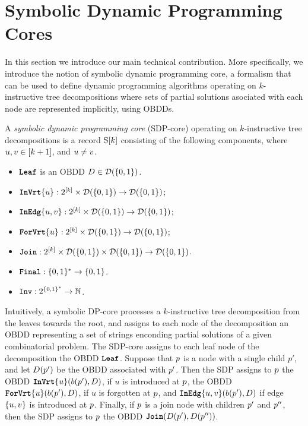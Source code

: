 \section{Symbolic Dynamic Programming Cores}
\label{SymbolicDPCores}

In this section we introduce our main technical contribution. More specifically, we introduce the notion of symbolic dynamic programming core, a formalism that can be used to define dynamic programming algorithms operating on $k$-instructive tree decompositions where sets of partial solutions asociated with each node are represented implicitly, using OBDDs. 

A {\em symbolic dynamic programming core} (SDP-core) operating on $k$-instructive tree decompositions is a record $\mathrm{S}[k]$ consisting of the following components, where $u,v \in [k+1]$, and 
$u\neq v$. 

\begin{itemize}
    \item $\texttt{\textbf{Leaf}}$ is an OBDD $D\in \mathcal{D}(\{0,1\})$. 
    \item $\texttt{\textbf{InVrt}}\{u\}:2^{[k]}\times  
    \mathcal{D}(\{0,1\})\rightarrow \mathcal{D}(\{0,1\})$;
    \item $\texttt{\textbf{InEdg}}\{u,v\}:2^{[k]}\times\mathcal{D}(\{0,1\})\rightarrow \mathcal{D}(\{0,1\})$;
    \item $\texttt{\textbf{ForVrt}}\{u\}:2^{[k]}\times \mathcal{D}(\{0,1\})\rightarrow \mathcal{D}(\{0,1\})$;
    \item $\texttt{\textbf{Join}}:2^{[k]}\times \mathcal{D}(\{0,1\})\times 
    \mathcal{D}(\{0,1\})
    \rightarrow 
    \mathcal{D}(\{0,1\})$.
    \item $\texttt{Final}:\{0,1\}^*\rightarrow \{0,1\}$. 
    \item $\texttt{Inv}:2^{\{0,1\}^*}\rightarrow \mathbb{N}$. 
\end{itemize}


Intuitively, a symbolic DP-core processes a $k$-instructive tree decomposition from the leaves towards the root, and assigns to each node of the decomposition an OBDD representing a set of strings enconding partial solutions of a given combinatorial problem. The SDP-core assigns to each leaf node of the decomposition the OBDD $\texttt{\textbf{Leaf}}$. Suppose that $p$ is a node with a single child $p'$, and let $D(p')$ be the OBDD associated with $p'$. Then the SDP assigns to $p$ the OBDD 
$\texttt{\textbf{InVrt}}\{u\}(b(p'),D)$, if $u$ is introduced at $p$, the OBDD 
$\texttt{\textbf{ForVrt}}\{u\}(b(p'),D)$, if $u$ is forgotten at $p$, and 
$\texttt{\textbf{InEdg}}\{u,v\}(b(p'),D)$ if edge $\{u,v\}$ is introduced at $p$. Finally, if $p$ is a join node with children $p'$ and $p''$, then the SDP assigns to $p$ the OBDD 
$\texttt{\textbf{Join}}(D(p'),D(p''))$. 

